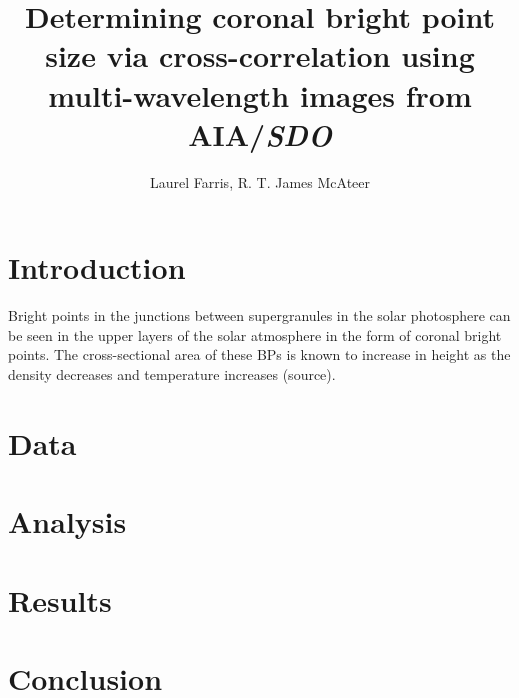 \documentclass[preprint2]{aastex}
\begin{document}
\title{Determining coronal bright point size via cross-correlation using
multi-wavelength images from AIA/\textit{SDO}}
\author{Laurel Farris, R. T. James McAteer}

\begin{abstract}
\end{abstract}

\section{Introduction}\label{intro}
Bright points in the junctions between supergranules in the solar photosphere
can be seen in the upper layers of the solar atmosphere in the form of coronal
bright points. The cross-sectional area of these BPs is known to increase in
height as the density decreases and temperature increases (source).
\section{Data}\label{data}
\section{Analysis}\label{analysis}
\section{Results}\label{results}
\section{Conclusion}\label{conclusion}


\end{document}
